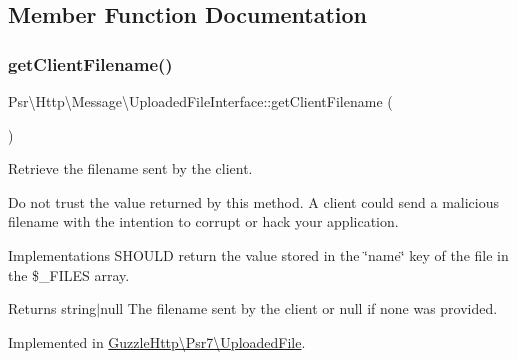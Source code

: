 \subsection{Member Function Documentation}
\mbox{\label{interfacePsr_1_1Http_1_1Message_1_1UploadedFileInterface_ac303b01505ed2b5fb175ff81fbde666d}} 
\subsubsection{\texorpdfstring{get\+Client\+Filename()}{getClientFilename()}}
{\footnotesize\ttfamily Psr\textbackslash{}\+Http\textbackslash{}\+Message\textbackslash{}\+Uploaded\+File\+Interface\+::get\+Client\+Filename (\begin{DoxyParamCaption}{ }\end{DoxyParamCaption})}

Retrieve the filename sent by the client.

Do not trust the value returned by this method. A client could send a malicious filename with the intention to corrupt or hack your application.

Implementations S\+H\+O\+U\+LD return the value stored in the \char`\"{}name\char`\"{} key of the file in the \$\+\_\+\+F\+I\+L\+ES array.

\begin{DoxyReturn}{Returns}
string$\vert$null The filename sent by the client or null if none was provided. 
\end{DoxyReturn}


Implemented in \hyperlink{classGuzzleHttp_1_1Psr7_1_1UploadedFile_a6565180d087f60e0645d4e29b76529fd}{Guzzle\+Http\textbackslash{}\+Psr7\textbackslash{}\+Uploaded\+File}.

\mbox{\label{interfacePsr_1_1Http_1_1Message_1_1UploadedFileInterface_a5996e9ed494dd17fa7839de56995feee}} 
